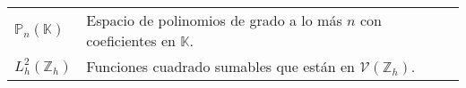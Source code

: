 \begin{tabular}{L{1.5 cm}p{12.5 cm}}
    $\mathbb{P}_{n}\left(\mathbb{K}\right)$ & Espacio de polinomios de grado a lo más $n$ con coeficientes en $\mathbb{K}$.                \\
    $L^{2}_{h}\left(\mathbb{Z}_{h}\right)$  & Funciones cuadrado sumables que están en $\mathcal{V}\left(\mathbb{Z}_{h}\right)$.
\end{tabular}

